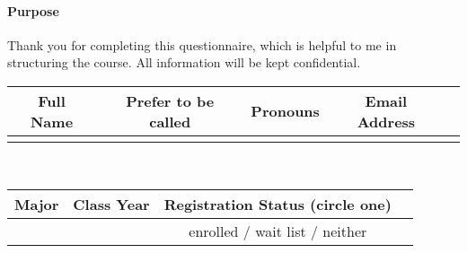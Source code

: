 \documentclass[10pt]{article}
\begin{document}

\paragraph*{Purpose} 
Thank you for completing this questionnaire, which is helpful to me in structuring the course.  All information will be kept confidential.

\begin{center}
\begin{tabular}{|c|c|c|c|c|}
  \hline
	Full Name & Prefer to be called & Pronouns & Email Address \\
	\hline 
	\hspace{1.7in} & \hspace{0.5in} & \hspace{0.5in} & \hspace{1.5in}  \\[3ex]
	\hline
\end{tabular}
\\[1ex]
\begin{tabular}{|c|c|c|c|}
  \hline
	  Major & Class Year &  Registration Status (circle one)  \\
	\hline 
	  \hspace{2.15in} & \hspace{1in} & enrolled / wait list / neither \\[2ex]
	\hline
\end{tabular}
\end{center}
\end{document}
